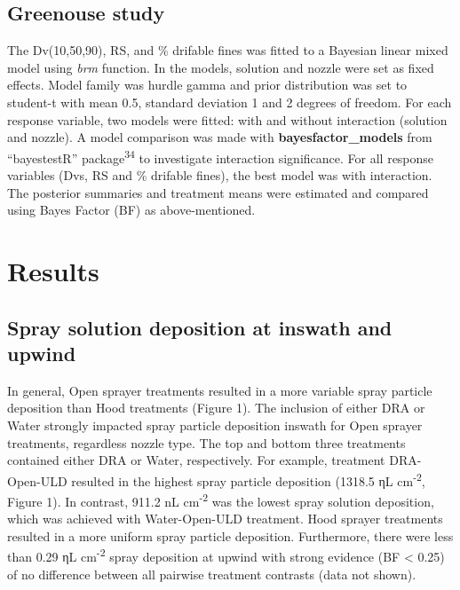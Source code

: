 \documentclass[
  12pt,
  a4paper,
]{article}
\begin{document}
\hypertarget{greenouse-study}{%
\subsection{Greenouse study}\label{greenouse-study}}

The Dv(10,50,90), RS, and \% drifable fines was fitted to a Bayesian
linear mixed model using \emph{brm} function. In the models, solution
and nozzle were set as fixed effects. Model family was hurdle gamma and
prior distribution was set to student-t with mean 0.5, standard
deviation 1 and 2 degrees of freedom. For each response variable, two
models were fitted: with and without interaction (solution and nozzle).
A model comparison was made with \textbf{bayesfactor\_models} from
``bayestestR'' package\textsuperscript{34} to investigate interaction
significance. For all response variables (Dvs, RS and \% drifable
fines), the best model was with interaction. The posterior summaries and
treatment means were estimated and compared using Bayes Factor (BF) as
above-mentioned.

\hypertarget{results}{%
\section{Results}\label{results}}

\hypertarget{spray-solution-deposition-at-inswath-and-upwind}{%
\subsection{Spray solution deposition at inswath and
upwind}\label{spray-solution-deposition-at-inswath-and-upwind}}

In general, Open sprayer treatments resulted in a more variable spray
particle deposition than Hood treatments (Figure 1). The inclusion of
either DRA or Water strongly impacted spray particle deposition inswath
for Open sprayer treatments, regardless nozzle type. The top and bottom
three treatments contained either DRA or Water, respectively. For
example, treatment DRA-Open-ULD resulted in the highest spray particle
deposition (1318.5 ηL cm\textsuperscript{-2}, Figure 1). In contrast,
911.2 nL cm\textsuperscript{-2} was the lowest spray solution
deposition, which was achieved with Water-Open-ULD treatment. Hood
sprayer treatments resulted in a more uniform spray particle deposition.
Furthermore, there were less than 0.29 ηL cm\textsuperscript{-2} spray
deposition at upwind with strong evidence (BF \textless{} 0.25) of no
difference between all pairwise treatment contrasts (data not shown).
\end{document}
